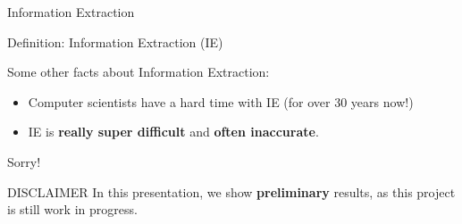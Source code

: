 \documentclass[xcolor=x11names, aspectratio=169,usenames,dvipsnames]{beamer}
\begin{document}
\begin{frame}{Information Extraction}
\begin{block}{Definition: Information Extraction (IE)}
\end{block}\pause\bigskip

\large{Some other facts about Information Extraction:}\normalsize
\begin{itemize}[<+->]
\item Computer scientists have a hard time with IE (for over \alert{30 years} now!)
\item IE is \textbf{\alert{really super difficult}} and \alert{\textbf{often inaccurate}}.
\end{itemize}
\end{frame}


\begin{frame}{Sorry!}
\begin{large}
\begin{alertblock}{\large DISCLAIMER}\vspace{.5em}
In this presentation, we show \textbf{preliminary} results, as this project is still work in progress.
\end{alertblock}
\end{large}
\end{frame}
\end{document}
